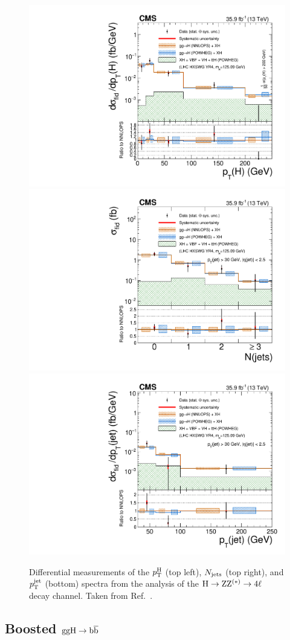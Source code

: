 \begin{figure}[hbtp]
  \begin{center}
    \includegraphics[width=0.49\linewidth]{img/inputs/hzz/pth.pdf}
    \includegraphics[width=0.49\linewidth]{img/inputs/hzz/njets.pdf}
    \\
    \includegraphics[width=0.49\linewidth]{img/inputs/hzz/ptjet.pdf}
    \caption{
        Differential measurements of the $p_\mathrm{T}^\mathrm{H}$ (top left), $N_\text{jets} $ (top right), and $p_\mathrm{T}^\text{jet} $ (bottom) spectra from the analysis of the $\mathrm{H}\to\mathrm{Z}\mathrm{Z}^{(\ast)}\to 4\ell$ decay channel.
        Taken from Ref.~\cite{Sirunyan:2017exp}.
        }
    \label{fig:hzz-results}
  \end{center}
\end{figure}



\subsection{\texorpdfstring{Boosted $\mathrm{g}\mathrm{g}\mathrm{H}\to\mathrm{b}\overline{\mathrm{b}}$}{Boosted ggHbb}}


